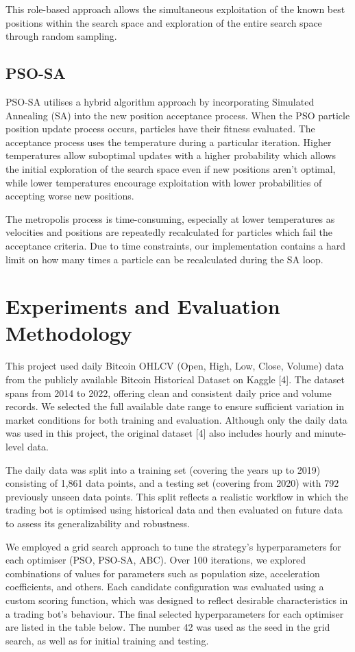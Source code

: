\documentclass[a4paper, 12pt]{extarticle}
\begin{document}
This role-based approach allows the simultaneous exploitation of the known best positions within the search space and exploration of the entire search space through random sampling. 

\subsection{PSO-SA} 
PSO-SA utilises a hybrid algorithm approach by incorporating Simulated Annealing (SA) into the new position acceptance process. When the PSO particle position update process occurs, particles have their fitness evaluated. The acceptance process uses the temperature during a particular iteration. Higher temperatures allow suboptimal updates with a higher probability which allows the initial exploration of the search space even if new positions aren't optimal, while lower temperatures encourage exploitation with lower probabilities of accepting worse new positions.   

The metropolis process is time-consuming, especially at lower temperatures as velocities and positions are repeatedly recalculated for particles which fail the acceptance criteria. Due to time constraints, our implementation contains a hard limit on how many times a particle can be recalculated during the SA loop. 

\section{Experiments and Evaluation Methodology}

This project used daily Bitcoin OHLCV (Open, High, Low, Close, Volume) data from the publicly available Bitcoin Historical Dataset on Kaggle [4]. The dataset spans from 2014 to 2022, offering clean and consistent daily price and volume records. We selected the full available date range to ensure sufficient variation in market conditions for both training and evaluation. Although only the daily data was used in this project, the original dataset [4] also includes hourly and minute-level data. 

The daily data was split into a training set (covering the years up to 2019) consisting of 1,861 data points, and a testing set (covering from 2020) with 792 previously unseen data points. This split reflects a realistic workflow in which the trading bot is optimised using historical data and then evaluated on future data to assess its generalizability and robustness. 

We employed a grid search approach to tune the strategy's hyperparameters for each optimiser (PSO, PSO-SA, ABC). Over 100 iterations, we explored combinations of values for parameters such as population size, acceleration coefficients, and others. Each candidate configuration was evaluated using a custom scoring function, which was designed to reflect desirable characteristics in a trading bot's behaviour. 
The final selected hyperparameters for each optimiser are listed in the table below. The number 42 was used as the seed in the grid search, as well as for initial training and testing.  
\end{document}
